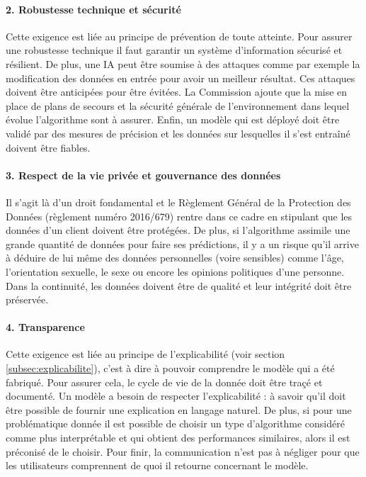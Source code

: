 \documentclass[10pt, french, a4paper]{report}
\begin{document}
\paragraph{2. Robustesse technique et sécurité} Cette exigence est liée au principe de prévention de toute atteinte. Pour assurer une robustesse technique il faut garantir un système d'information sécurisé et résilient. De plus, une IA peut être soumise à des attaques comme par exemple la modification des données en entrée pour avoir un meilleur résultat. Ces attaques doivent être anticipées pour être évitées. La Commission ajoute que la mise en place de plans de secours et la sécurité générale de l'environnement dans lequel évolue l'algorithme sont à assurer. Enfin, un modèle qui est déployé doit être validé par des mesures de précision et les données sur lesquelles il s'est entraîné doivent être fiables.

\paragraph{3. Respect de la vie privée et gouvernance des données} Il s'agit là d'un droit fondamental et le Règlement Général de la Protection des Données (règlement numéro 2016/679) rentre dans ce cadre en stipulant que les données d'un client doivent être protégées. De plus, si l'algorithme assimile une grande quantité de données pour faire ses prédictions, il y a un risque qu'il arrive à déduire de lui même des données personnelles (voire sensibles) comme l'âge, l'orientation sexuelle, le sexe ou encore les opinions politiques d'une personne. Dans la continuité, les données doivent être de qualité et leur intégrité doit être préservée. 

\paragraph{4. Transparence} Cette exigence est liée au principe de l'explicabilité (voir section \ref{subsec:explicabilite}), c'est à dire à pouvoir comprendre le modèle qui a été fabriqué. Pour assurer cela, le cycle de vie de la donnée doit être traçé et documenté. Un modèle a besoin de respecter l'explicabilité : à savoir qu'il doit être possible de fournir une explication en langage naturel. De plus, si pour une problématique donnée il est possible de choisir un type d'algorithme considéré comme plus interprétable et qui obtient des performances similaires, alors il est préconisé de le choisir. Pour finir, la communication n'est pas à négliger pour que les utilisateurs comprennent de quoi il retourne concernant le modèle. 
\end{document}
